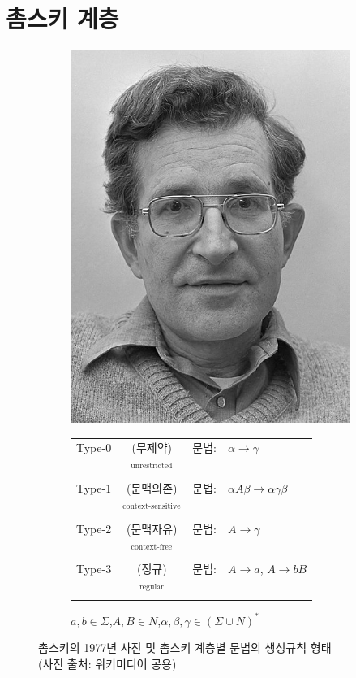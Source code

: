\documentclass[b5paper,chapter,figtabcapt]{oblivoir}
\begin{document}
\section{촘스키 계층}
\begin{figure}\centering
\begin{subfigure}{.25\textwidth}
\includegraphics[]{imgs/Chomsky1977.jpg}
\end{subfigure}
\begin{subfigure}{.6\textwidth}
\begin{tabular}{lcrl}
Type-0\!\!\!\!\!\!&(무제약)  &\!\!\!\!\!\!문법:& $\alpha\to\gamma$
\\    \!\!\!\!\!\!&$^{\text{unrestricted}}$& \\
Type-1\!\!\!\!\!\!&(문맥의존)&\!\!\!\!\!\!문법:& $\alpha A\beta\to\alpha\gamma\beta$
\\    \!\!\!\!\!\!&$^{\text{context-sensitive}}$& \\
Type-2\!\!\!\!\!\!&(문맥자유)&\!\!\!\!\!\!문법:& $A\to \gamma$
\\    \!\!\!\!\!\!&$^{\text{context-free}}$& \\
Type-3\!\!\!\!\!\!&(정규)    &\!\!\!\!\!\!문법:& $A\to a$, $A\to bB$
\\    \!\!\!\!\!\!&$^{\text{regular}}$&
\end{tabular}
\begin{center}
\quad$a,b\in \Sigma$,\quad$A,B\in N$,\quad$\alpha,\beta,\gamma\in(\Sigma\cup N)^*$
\end{center}
\end{subfigure}
\caption{촘스키의 1977년 사진 및 촘스키 계층별 문법의 생성규칙 형태
         \label{fig:ChomskyHierarchyGrammar}\\
         {\scriptsize(사진 출처: 위키미디어 공용)} }
\end{figure}
\end{document}
